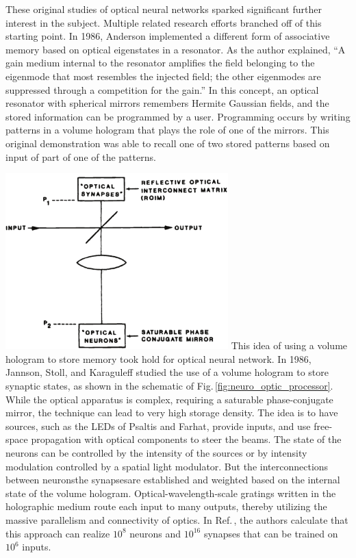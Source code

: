 These original studies of optical neural networks sparked significant further interest in the subject. Multiple related research efforts branched off of this starting point. In 1986, Anderson implemented a different form of associative memory \cite{an1986} based on optical eigenstates in a resonator. As the author explained, ``A gain medium internal to the resonator amplifies the field belonging to the eigenmode that most resembles the injected field; the other eigenmodes are suppressed through a competition for the gain.'' In this concept, an optical resonator with spherical mirrors remembers Hermite Gaussian fields, and the stored information can be programmed by a user. Programming occurs by writing patterns in a volume hologram that plays the role of one of the mirrors. This original demonstration was able to recall one of two stored patterns based on input of part of one of the patterns.

\includegraphics[width=8.6cm]{figures/_neuro_optic_processor.pdf}
This idea of using a volume hologram to store memory took hold for optical neural network. In 1986, Jannson, Stoll, and Karaguleff studied the use of a volume hologram to store synaptic states, as shown in the schematic of Fig.\,\ref{fig:neuro_optic_processor}. While the optical apparatus is complex, requiring a saturable phase-conjugate mirror, the technique can lead to very high storage density. The idea is to have sources, such as the LEDs of Psaltis and Farhat, provide inputs, and use free-space propagation with optical components to steer the beams. The state of the neurons can be controlled by the intensity of the sources or by intensity modulation controlled by a spatial light modulator. But the interconnections between neurons\textemdash the synapses\textemdash are established and weighted based on the internal state of the volume hologram. Optical-wavelength-scale gratings written in the holographic medium route each input to many outputs, thereby utilizing the massive parallelism and connectivity of optics. In Ref.\,\cite{jast1986}, the authors calculate that this approach can realize $10^8$ neurons and $10^{16}$ synapses that can be trained on $10^6$ inputs. 

